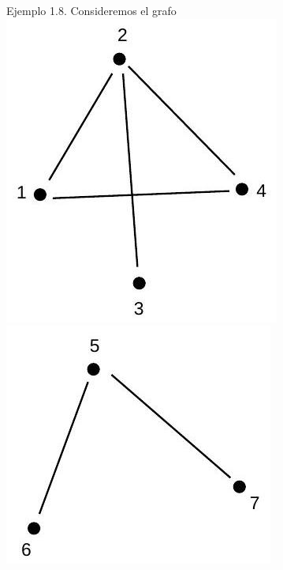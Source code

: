 \documentclass[10pt]{article}
\begin{document}
Ejemplo 1.8. Consideremos el grafo\\
\includegraphics[max width=\textwidth, center]{2025_09_05_93c7c1835f249f70c0eeg-02(1)}\\
\includegraphics[max width=\textwidth, center]{2025_09_05_93c7c1835f249f70c0eeg-02(2)}
\end{document}
